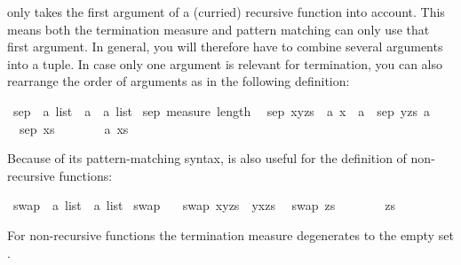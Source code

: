 \begin{isabellebody}
\begin{isamarkuptext}
\begin{warn}
   only takes the first argument of a (curried)
  recursive function into account. This means both the termination measure
  and pattern matching can only use that first argument. In general, you will
  therefore have to combine several arguments into a tuple. In case only one
  argument is relevant for termination, you can also rearrange the order of
  arguments as in the following definition:
\end{warn}%
\end{isamarkuptext}%
\ sep{}\ {\isacharcolon}{\isacharcolon}\ {\isachardoublequote}{\isacharprime}a\ list\ {\isasymRightarrow}\ {\isacharprime}a\ {\isasymRightarrow}\ {\isacharprime}a\ list{\isachardoublequote}\isanewline
{}\ sep{}\ {\isachardoublequote}measure\ length{\isachardoublequote}\isanewline
\ \ {\isachardoublequote}sep{}\ {\isacharparenleft}x{\isacharhash}y{\isacharhash}zs{\isacharparenright}\ {\isacharequal}\ {\isacharparenleft}{\isasymlambda}a{\isachardot}\ x\ {\isacharhash}\ a\ {\isacharhash}\ sep{}\ {\isacharparenleft}y{\isacharhash}zs{\isacharparenright}\ a{\isacharparenright}{\isachardoublequote}\isanewline
\ \ {\isachardoublequote}sep{}\ xs\ \ \ \ \ \ \ {\isacharequal}\ {\isacharparenleft}{\isasymlambda}a{\isachardot}\ xs{\isacharparenright}{\isachardoublequote}%
\begin{isamarkuptext}%
Because of its pattern-matching syntax,  is also useful
for the definition of non-recursive functions:%
\end{isamarkuptext}%
\ swap{}{}\ {\isacharcolon}{\isacharcolon}\ {\isachardoublequote}{\isacharprime}a\ list\ {\isasymRightarrow}\ {\isacharprime}a\ list{\isachardoublequote}\isanewline
{}\ swap{}{}\ {\isachardoublequote}{\isacharbraceleft}{\isacharbraceright}{\isachardoublequote}\isanewline
\ \ {\isachardoublequote}swap{}{}\ {\isacharparenleft}x{\isacharhash}y{\isacharhash}zs{\isacharparenright}\ {\isacharequal}\ y{\isacharhash}x{\isacharhash}zs{\isachardoublequote}\isanewline
\ \ {\isachardoublequote}swap{}{}\ zs\ \ \ \ \ \ \ {\isacharequal}\ zs{\isachardoublequote}%
\begin{isamarkuptext}%
\noindent
For non-recursive functions the termination measure degenerates to the empty
set \isa{{\isacharbraceleft}{\isacharbraceright}}.%
\end{isamarkuptext}%
\end{isabellebody}%
